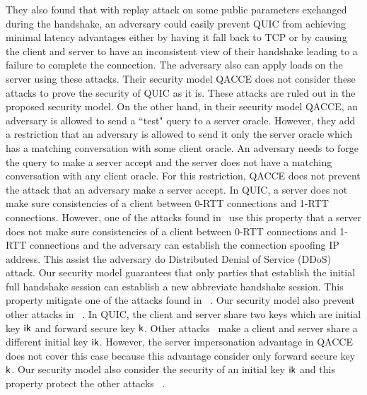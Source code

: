 They also found that with replay attack on some
public parameters exchanged during the handshake, an
adversary could easily prevent QUIC from achieving
minimal latency advantages either by having it fall back
to TCP or by causing the client and server to have an
inconsistent view of their handshake leading to a failure
to complete the connection.
The adversary also can apply loads on the server using
these attacks.
Their security model QACCE does not consider these attacks
to prove the security of QUIC as it is.
These attacks are ruled out in the proposed security model.
On the other hand, in their security model QACCE, an adversary
is allowed to send a ``test" query to a server oracle.
However, they add a restriction that an adversary is allowed
to send it only the server oracle which has a matching
conversation with some client oracle.
An adversary needs to forge the query to make a server accept
and the server does not have a matching conversation with any
client oracle.
For this restriction, QACCE does not prevent the attack that
an adversary make a server accept.
In QUIC, a server does not make sure consistencies of a client
between 0-RTT connections and 1-RTT connections.
However, one of the attacks found in~\cite{LJBN15:QUIC} use this
property that a server does not make sure consistencies of a client
between 0-RTT connections and 1-RTT connections and the adversary
can establish the connection spoofing IP address.
This assist the adversary do Distributed Denial of Service
(DDoS) attack.
Our security model guarantees that only parties
that establish the initial full handshake session can
establish a new abbreviate handshake session.
This property mitigate one of the attacks found in
~\cite{LJBN15:QUIC}.
Our security model also prevent other attacks in
~\cite{LJBN15:QUIC}.
In QUIC, the client and server share two keys which are initial
key $\mathsf{ik}$ and forward secure key $\mathsf{k}$.
Other attacks~\cite{LJBN15:QUIC} make a client and server share
a different initial key $\mathsf{ik}$.
However, the server impersonation advantage in QACCE does not
cover this case because this advantage consider only forward
secure key $\mathsf{k}$.
Our security model also consider the security of an initial
key $\mathsf{ik}$ and this property protect the other attacks
~\cite{LJBN15:QUIC}.

